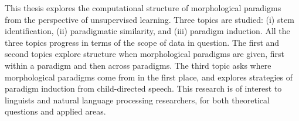 This thesis explores the computational structure of morphological paradigms from the perspective of unsupervised learning. Three topics are studied: (i) stem identification, (ii) paradigmatic similarity, and (iii) paradigm induction. All the three topics progress in terms of the scope of data in question. The first and second topics explore structure when morphological paradigms are given, first within a paradigm and then across paradigms. The third topic asks where morphological paradigms come from in the first place, and explores strategies of paradigm induction from child-directed speech. This research is of interest to linguists and natural language processing researchers, for both theoretical questions and applied areas.
